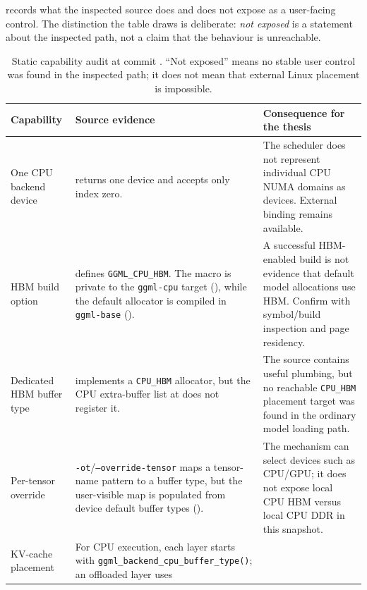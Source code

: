  records what the inspected source does and
does not expose as a user-facing control.  The distinction the table
draws is deliberate: \emph{not exposed} is a statement about the
inspected path, not a claim that the behaviour is unreachable.

\begin{table}[htbp]
\centering
\footnotesize
\caption{Static capability audit at commit \commitshort{}.  ``Not
exposed'' means no stable user control was found in the inspected path;
it does not mean that external Linux placement is impossible.}
\label{tab:runtime-audit}
\begin{tabularx}{\textwidth}{@{}P{2.8cm}P{5.35cm}Y@{}}
\toprule
\headrow
\textbf{Capability} & \textbf{Source evidence} &
\textbf{Consequence for the thesis} \\
\midrule
One CPU backend device
&  returns one device
  and accepts only index zero.
& The scheduler does not represent individual CPU NUMA domains as
  devices.  External binding remains available. \\
\addlinespace
HBM build option
&  defines
  \texttt{GGML\_CPU\_HBM}.  The macro is private to the
  \texttt{ggml-cpu} target
  (), while the default
  allocator is compiled in \texttt{ggml-base}
  ().
& A successful HBM-enabled build is not evidence that default model
  allocations use HBM.  Confirm with symbol/build inspection and
  page residency. \\
\addlinespace
Dedicated HBM buffer type
&  implements a
  \texttt{CPU\_HBM} allocator, but the CPU extra-buffer list at
   does not register it.
& The source contains useful plumbing, but no reachable
  \texttt{CPU\_HBM} placement target was found in the ordinary model
  loading path. \\
\addlinespace
Per-tensor override
& \texttt{-ot}/\texttt{--override-tensor} maps a tensor-name pattern
  to a buffer type, but the user-visible map is populated from device
  default buffer types
  ().
& The mechanism can select devices such as CPU/GPU; it does not expose
  local CPU HBM versus local CPU DDR in this snapshot. \\
\addlinespace
KV-cache placement
& For CPU execution, each layer starts with
  \texttt{ggml\_backend\_cpu\_buffer\_type()}; an offloaded layer uses

\end{tabularx}
\end{table}
